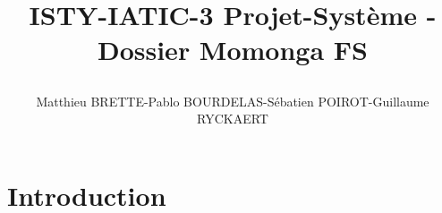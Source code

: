 \documentclass{report}
\begin{document}
\onehalfspacing
\title{%
    \begin{minipage}\linewidth
        \centering
        ISTY-IATIC-3
        \vskip 3pt
        \large Projet-Système - Dossier Momonga FS
    \author{Matthieu BRETTE-Pablo BOURDELAS-Sébatien POIROT-Guillaume RYCKAERT}
    \end{minipage}
 }
 \maketitle

 \section*{Introduction}
\end{document}
